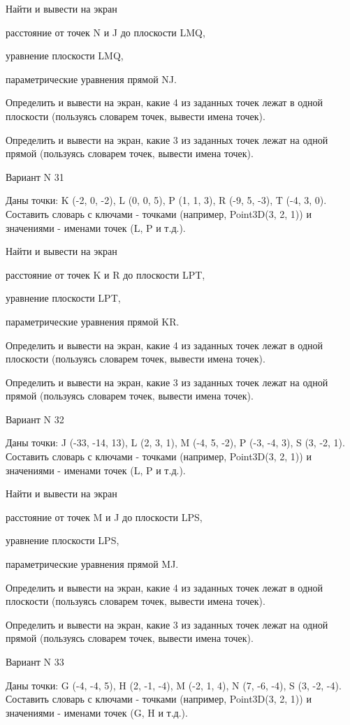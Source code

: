 \documentclass[11pt]{report}
\begin{document}
 
Найти и вывести на экран


расстояние от точек N и J до плоскости LMQ,

 
уравнение плоскости LMQ,

 
параметрические уравнения прямой NJ.


Определить и вывести на экран, какие 4 из заданных точек лежат в одной плоскости (пользуясь словарем точек, вывести имена точек).


Определить и вывести на экран, какие 3 из заданных точек лежат на одной прямой (пользуясь словарем точек, вывести имена точек).

Вариант N 31

Даны точки: K (-2, 0, -2), L (0, 0, 5), P (1, 1, 3), R (-9, 5, -3), T (-4, 3, 0).
Составить словарь с ключами - точками (например, Point3D(3, 2, 1)) и значениями - именами точек (L, P и т.д.).

 
Найти и вывести на экран


расстояние от точек K и R до плоскости LPT,

 
уравнение плоскости LPT,

 
параметрические уравнения прямой KR.


Определить и вывести на экран, какие 4 из заданных точек лежат в одной плоскости (пользуясь словарем точек, вывести имена точек).


Определить и вывести на экран, какие 3 из заданных точек лежат на одной прямой (пользуясь словарем точек, вывести имена точек).

Вариант N 32

Даны точки: J (-33, -14, 13), L (2, 3, 1), M (-4, 5, -2), P (-3, -4, 3), S (3, -2, 1).
Составить словарь с ключами - точками (например, Point3D(3, 2, 1)) и значениями - именами точек (L, P и т.д.).

 
Найти и вывести на экран


расстояние от точек M и J до плоскости LPS,

 
уравнение плоскости LPS,

 
параметрические уравнения прямой MJ.


Определить и вывести на экран, какие 4 из заданных точек лежат в одной плоскости (пользуясь словарем точек, вывести имена точек).


Определить и вывести на экран, какие 3 из заданных точек лежат на одной прямой (пользуясь словарем точек, вывести имена точек).

Вариант N 33

Даны точки: G (-4, -4, 5), H (2, -1, -4), M (-2, 1, 4), N (7, -6, -4), S (3, -2, -4).
Составить словарь с ключами - точками (например, Point3D(3, 2, 1)) и значениями - именами точек (G, H и т.д.).
\end{document}
